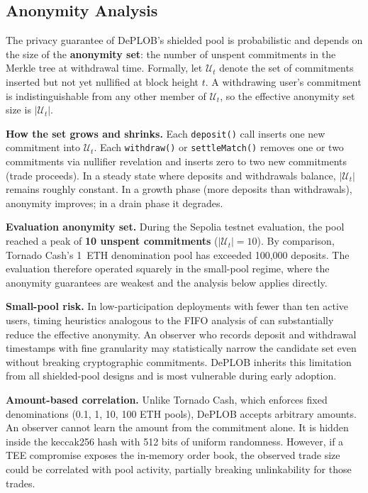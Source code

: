 \documentclass[12pt,a4paper]{article}
\begin{document}
\subsection{Anonymity Analysis}

The privacy guarantee of DePLOB's shielded pool is probabilistic and depends on the size of the \textbf{anonymity set}: the number of unspent commitments in the Merkle tree at withdrawal time. Formally, let $\mathcal{U}_t$ denote the set of commitments inserted but not yet nullified at block height $t$. A withdrawing user's commitment is indistinguishable from any other member of $\mathcal{U}_t$, so the effective anonymity set size is $|\mathcal{U}_t|$.

\textbf{How the set grows and shrinks.} Each \texttt{deposit()} call inserts one new commitment into $\mathcal{U}_t$. Each \texttt{withdraw()} or \texttt{settleMatch()} removes one or two commitments via nullifier revelation and inserts zero to two new commitments (trade proceeds). In a steady state where deposits and withdrawals balance, $|\mathcal{U}_t|$ remains roughly constant. In a growth phase (more deposits than withdrawals), anonymity improves; in a drain phase it degrades.

\textbf{Evaluation anonymity set.} During the Sepolia testnet evaluation, the pool reached a peak of \textbf{10 unspent commitments} ($|\mathcal{U}_t| = 10$). By comparison, Tornado Cash's 1~ETH denomination pool has exceeded 100{,}000 deposits. The evaluation therefore operated squarely in the small-pool regime, where the anonymity guarantees are weakest and the analysis below applies directly.

\textbf{Small-pool risk.} In low-participation deployments with fewer than ten active users, timing heuristics analogous to the FIFO analysis of \textcite{tang2021analysis} can substantially reduce the effective anonymity. An observer who records deposit and withdrawal timestamps with fine granularity may statistically narrow the candidate set even without breaking cryptographic commitments. DePLOB inherits this limitation from all shielded-pool designs and is most vulnerable during early adoption.

\textbf{Amount-based correlation.} Unlike Tornado Cash, which enforces fixed denominations (0.1, 1, 10, 100 ETH pools), DePLOB accepts arbitrary amounts. An observer cannot learn the amount from the commitment alone. It is hidden inside the keccak256 hash with 512 bits of uniform randomness. However, if a TEE compromise exposes the in-memory order book, the observed trade size could be correlated with pool activity, partially breaking unlinkability for those trades.
\end{document}
